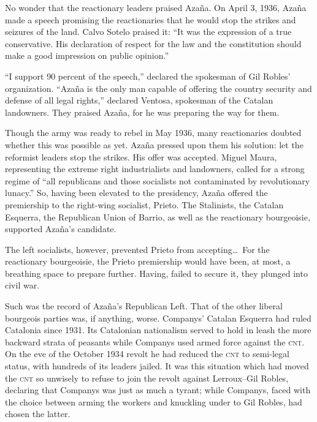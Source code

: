 No wonder that the reactionary leaders praised Azaña. On April 3, 1936, Azaña made a speech promising the reactionaries that he would stop the strikes and seizures of the land. Calvo Sotelo praised it: ``It was the expression of a true conservative. His declaration of respect for the law and the constitution should make a good impression on public opinion.''

``I support 90 percent of the speech,'' declared the spokesman of Gil Robles’ organization. ``Azaña is the only man capable of offering the country security and defense of all legal rights,'' declared Ventosa, spokesman of the Catalan landowners. They praised Azaña, for he was preparing the way for them.

Though the army was ready to rebel in May 1936, many reactionaries doubted whether this was possible as yet. Azaña pressed upon them his solution: let the reformist leaders stop the strikes. His offer was accepted. Miguel Maura, representing the extreme right industrialists and landowners, called for a strong regime of ``all republicans and those socialists not contaminated by revolutionary lunacy.'' So, having been elevated to the presidency, Azaña offered the premiership to the right-wing socialist, Prieto. The Stalinists, the Catalan Esquerra{\indexEsquerra}, the Republican Union of Barrio, as well as the reactionary bourgeoisie, supported Azaña’s candidate.

The left socialists, however, prevented Prieto{\indexIPrieto} from accepting\ldots\ For the reactionary bourgeoisie, the Prieto premiership would have been, at most, a breathing space to prepare further. Having, failed to secure it, they plunged into civil war.

Such was the record of Azaña’s Republican Left. That of the other liberal bourgeois parties was, if anything, worse. Companys’ Catalan Esquerra had ruled Catalonia since 1931.{\indexLCompanys} Its Catalonian nationalism served to hold in leash the more backward strata of peasants while Companys used armed force against the \textsc{cnt}. On the eve of the October 1934 revolt he had reduced the \textsc{cnt} to semi-legal status, with hundreds of its leaders jailed. It was this situation which had moved the \textsc{cnt} so unwisely to refuse to join the revolt against Lerroux--Gil Robles, declaring that Companys was just as much a tyrant; while Companys, faced with the choice between arming the workers and knuckling under to Gil Robles, had chosen the latter.

